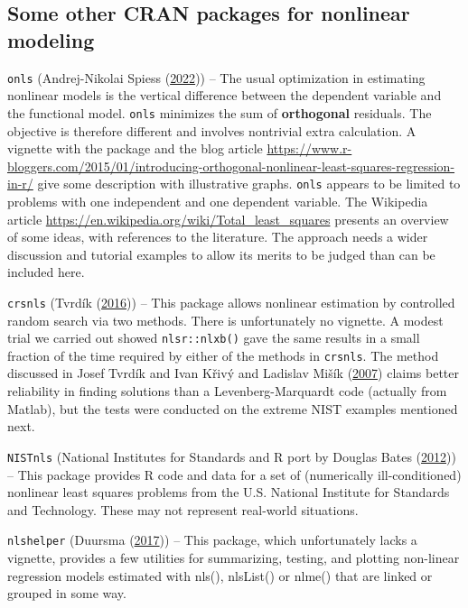 \documentclass[
]{article}
\begin{document}
\hypertarget{some-other-cran-packages-for-nonlinear-modeling}{%
\subsection{Some other CRAN packages for nonlinear
modeling}\label{some-other-cran-packages-for-nonlinear-modeling}}

\texttt{onls} (Andrej-Nikolai Spiess
(\protect\hyperlink{ref-R-onls-manual}{2022})) -- The usual optimization
in estimating nonlinear models is the vertical difference between the
dependent variable and the functional model. \texttt{onls} minimizes the
sum of \textbf{orthogonal} residuals. The objective is therefore
different and involves nontrivial extra calculation. A vignette with the
package and the blog article
\url{https://www.r-bloggers.com/2015/01/introducing-orthogonal-nonlinear-least-squares-regression-in-r/}
give some description with illustrative graphs. \texttt{onls} appears to
be limited to problems with one independent and one dependent variable.
The Wikipedia article
\url{https://en.wikipedia.org/wiki/Total_least_squares} presents an
overview of some ideas, with references to the literature. The approach
needs a wider discussion and tutorial examples to allow its merits to be
judged than can be included here.

\texttt{crsnls} (Tvrdík (\protect\hyperlink{ref-R-crsnls-manual}{2016}))
-- This package allows nonlinear estimation by controlled random search
via two methods. There is unfortunately no vignette. A modest trial we
carried out showed \texttt{nlsr::nlxb()} gave the same results in a
small fraction of the time required by either of the methods in
\texttt{crsnls}. The method discussed in Josef Tvrdík and Ivan Křivý and
Ladislav Mišík (\protect\hyperlink{ref-tvrdik2007}{2007}) claims better
reliability in finding solutions than a Levenberg-Marquardt code
(actually from Matlab), but the tests were conducted on the extreme NIST
examples mentioned next.

\texttt{NISTnls} (National Institutes for Standards and R port by
Douglas Bates (\protect\hyperlink{ref-NISTnls-manual}{2012})) -- This
package provides R code and data for a set of (numerically
ill-conditioned) nonlinear least squares problems from the U.S. National
Institute for Standards and Technology. These may not represent
real-world situations.

\texttt{nlshelper} (Duursma
(\protect\hyperlink{ref-nlshelper-manual}{2017})) -- This package, which
unfortunately lacks a vignette, provides a few utilities for
summarizing, testing, and plotting non-linear regression models
estimated with nls(), nlsList() or nlme() that are linked or grouped in
some way.
\end{document}

